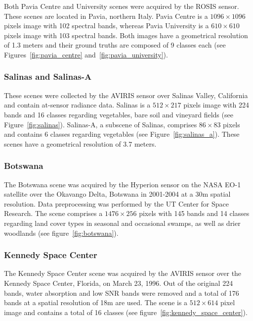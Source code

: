 \documentclass[parskip=full]{scrartcl}
\begin{document}
Both Pavia Centre and University scenes were acquired by the ROSIS sensor. These
scenes are located in Pavia, northern Italy. Pavia Centre is a $1096 \times
1096$ pixels image with 102 spectral bands, whereas Pavia University is a $610
\times 610$ pixels image with 103 spectral bands.  Both images have a
geometrical resolution of 1.3 meters and their ground truths are composed of 9
classes each (see Figures~\ref{fig:pavia_centre}
and~\ref{fig:pavia_university}).

\subsubsection*{Salinas and Salinas-A}

These scenes were collected by the AVIRIS sensor over Salinas Valley, California
and contain at-sensor radiance data. Salinas is a $512 \times 217$ pixels image
with 224 bands and 16 classes regarding vegetables, bare soil and vineyard
fields (see Figure~\ref{fig:salinas}). Salinas-A, a subscene of Salinas,
comprises $86 \times 83$ pixels and contains 6 classes regarding vegetables (see
Figure~\ref{fig:salinas_a}). These scenes have a geometrical resolution of 3.7
meters.

\subsubsection*{Botswana}

The Botswana scene was acquired by the Hyperion sensor on the NASA EO-1
satellite over the Okavango Delta, Botswana in 2001-2004 at a 30m spatial
resolution. Data preprocessing was performed by the UT Center for Space
Research. The scene comprises a $1476 \times 256$ pixels with 145 bands and 14
classes regarding land cover types in seasonal and occasional swamps, as well as
drier woodlands (see figure~\ref{fig:botswana}).

\subsubsection*{Kennedy Space Center}

The Kennedy Space Center scene was acquired by the AVIRIS sensor over the
Kennedy Space Center, Florida, on March 23, 1996. Out of the original 224 bands,
water absorption and low SNR bands were removed and a total of 176 bands at a
spatial resolution of 18m are used. The scene is a $512 \times 614$ pixel image
and contains a total of 16 classes (see figure~\ref{fig:kennedy_space_center}).
\end{document}
